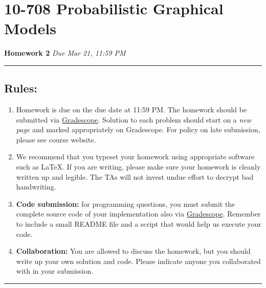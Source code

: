 \documentclass{article}
\begin{document}
\section*{10-708 Probabilistic Graphical Models}
{\large \bf Homework 2} \hfill {\it Due Mar 21, 11:59 PM}

\noindent\rule{\textwidth}{1pt}

\vspace{5ex}
\subsection*{Rules:}
\vspace{2ex}

\begin{enumerate}
\item Homework is due on the due date at 11:59 PM. The homework should be submitted via \href{https://gradescope.com/courses/14138}{Gradescope}. Solution to each problem should start on a {\it new page} and marked appropriately on Gradescope. For policy on late submission, please see course website.

\item We recommend that you typeset your homework using appropriate software such as \LaTeX. If you are writing, please make sure your homework is cleanly written up and legible. The TAs will not invest undue effort to decrypt bad handwriting.

\item {\bf Code submission:} for programming questions, you must submit the complete source code of your implementation also via \href{https://gradescope.com/courses/14138}{Gradescope}. Remember to include a small README file and a script that would help us execute your code.

\item {\bf Collaboration:} You are allowed to discuss the homework, but you should write up your own solution and code. Please indicate anyone you collaborated with in your submission.

\end{enumerate}

\vspace{7ex}
\noindent\rule{\textwidth}{1pt}

\newpage


\newpage

\newpage

\newpage


%

\end{document}
